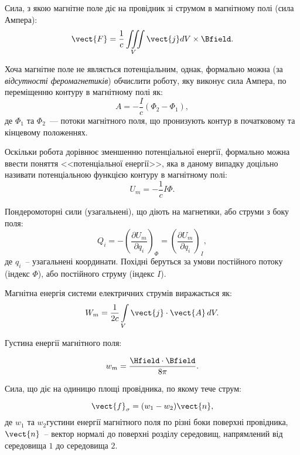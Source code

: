 \begin{Theory}\small
Сила, з якою магнітне поле діє на провідник зі струмом в магнітному полі (сила Ампера):
\begin{equation}
	\vect{F} = \frac1c \iiint\limits_V \vect{j} dV \times\Bfield.
\end{equation}


\begin{Attention}
	Хоча магнітне поле не являється потенціальним, однак, формально можна  (за \emph{відсутності феромагнетиків}) обчислити роботу, яку виконує сила Ампера, по переміщенню контуру в магнітному полі як:
	\begin{equation}
		A = - \frac{I}{c}(\Phi_2 - \Phi_1),
	\end{equation}
де $\Phi_1$ та $\Phi_2$~--- потоки магнітного поля, що пронизують контур в початковому та кінцевому положеннях.

Оскільки робота дорівнює зменшенню потенціальної енергії, формально можна ввести поняття <<потенціальної енергії>>, яка в даному випадку доцільно називати потенціальною функцією контуру в магнітному полі:
\begin{equation}
	U_m = -\frac1c I\Phi.
\end{equation}
\end{Attention}

Пондеромоторні сили (узагальнені), що діють на магнетики, або струми з боку поля:
\begin{equation}
	Q_i = - \left(\frac{\partial U_m}{\partial q_i} \right)_{\Phi} =   \left(\frac{\partial U_m}{\partial q_i} \right)_I,
\end{equation}
де $q_i$~-- узагальнені координати. Похідні беруться за умови постійного потоку (індекс $\Phi$), або постійного струму (індекс $I$).

Магнітна енергія системи електричних струмів виражається як:
\begin{equation}
	W_m =  \frac{1}{2c} \int\limits_V \vect{j}\cdot\vect{A}\,dV.
\end{equation}

Густина енергії магнітного поля:

\begin{equation}
	w_m = \frac{\Hfield\cdot \Bfield}{8\pi}.
\end{equation}

Сила, що діє на одиницю площі провідника, по якому тече струм:

\begin{equation}
	\vect{f}_{\sigma} = ( w_1 - w_2)\vect{n},
\end{equation}
де $w_1$ та $w_2$густини енергії магнітного поля по різні боки поверхні провідника, $\vect{n}$~-- вектор нормалі до поверхні розділу середовищ, напрямлений від середовища $1$ до середовища $2$.


\end{Theory}
